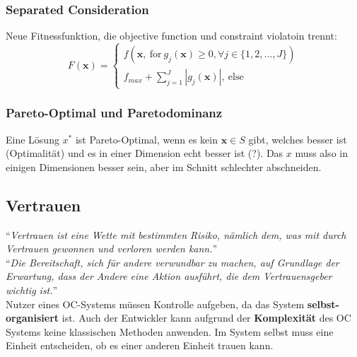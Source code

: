 \documentclass[a4paper]{article}
\begin{document}
\subsubsection{Separated Consideration}
Neue Fitnessfunktion, die objective function und constraint violatoin trennt:
$$F(\mathbf{x})=\left\{\begin{matrix}
f(\mathbf{x}, \ \text{for} \ g_j(\mathbf{x})\geq0, \forall j\in\{1,2,\dots,J\}
)\\
f_{max} + \sum_{j=1}^{J} |g_j(\mathbf{x})|, \ \text{else}
\end{matrix}
\right.$$
\subsubsection{Pareto-Optimal und Paretodominanz}
Eine Lösung $x^*$ ist Pareto-Optimal, wenn es kein $\mathbf{x}\in S$ gibt, welches besser ist (Optimalität) und es in einer Dimension echt besser ist (?). Das $x$ muss also in einigen Dimensionen besser sein, aber im Schnitt schlechter abschneiden.

\subsection{Vertrauen}
``\textit{Vertrauen ist eine Wette mit bestimmten Risiko, nämlich dem, was mit durch Vertrauen gewonnen und verloren werden kann.}''\\

``\textit{Die Bereitschaft, sich für andere verwundbar zu machen, auf Grundlage der Erwartung, dass der Andere eine Aktion ausführt, die dem Vertrauensgeber wichtig ist.}''\\

Nutzer eines OC-Systems müssen Kontrolle aufgeben, da das System \textbf{selbst-organisiert} ist. Auch der Entwickler kann aufgrund der \textbf{Komplexität} des OC Systems keine klassischen Methoden anwenden. Im System selbst muss eine Einheit entscheiden, ob es einer anderen Einheit trauen kann.\\
\end{document}
